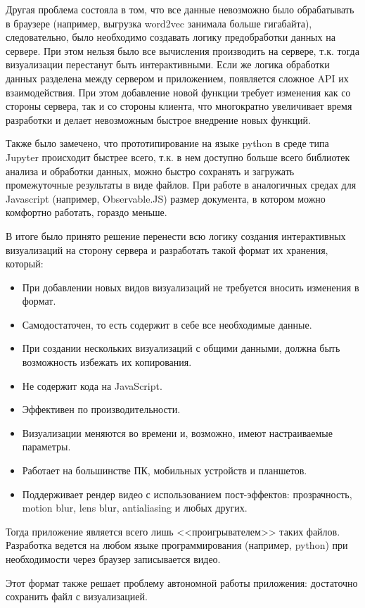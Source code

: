 Другая проблема состояла в том, что все данные невозможно было обрабатывать в браузере (например, выгрузка word2vec занимала больше гигабайта), следовательно, было необходимо создавать логику предобработки данных на сервере. При этом нельзя было все вычисления производить на сервере, т.к. тогда визуализации перестанут быть интерактивными. Если же логика обработки данных разделена между сервером и приложением, появляется сложное API их взаимодействия. При этом добавление новой функции требует изменения как со стороны сервера, так и со стороны клиента, что многократно увеличивает время разработки и делает невозможным быстрое внедрение новых функций.

Также было замечено, что прототипирование на языке python в среде типа Jupyter происходит быстрее всего, т.к. в нем доступно больше всего библиотек анализа и обработки данных, можно быстро сохранять и загружать промежуточные результаты в виде файлов. При работе в аналогичных средах для Javascript (например, Observable.JS) размер документа, в котором можно комфортно работать, гораздо меньше.

В итоге было принято решение перенести всю логику создания интерактивных визуализаций на сторону сервера и разработать такой формат их хранения, который:
\begin{itemize}
\item При добавлении новых видов визуализаций не требуется вносить изменения в формат.
\item Самодостаточен, то есть содержит в себе все необходимые данные.
\item При создании нескольких визуализаций с общими данными, должна быть возможность избежать их копирования.
\item Не содержит кода на JavaScript.
\item Эффективен по производительности.
\item Визуализации меняются во времени и, возможно, имеют настраиваемые параметры.
\item Работает на большинстве ПК, мобильных устройств и планшетов.
\item Поддерживает рендер видео с использованием пост-эффектов: прозрачность, motion blur, lens blur, antialiasing и любых других.
\end{itemize}
Тогда приложение является всего лишь <<проигрывателем>> таких файлов. Разработка ведется на любом языке программирования (например, python) при необходимости через браузер записывается видео.

Этот формат также решает проблему автономной работы приложения: достаточно сохранить файл с визуализацией.

